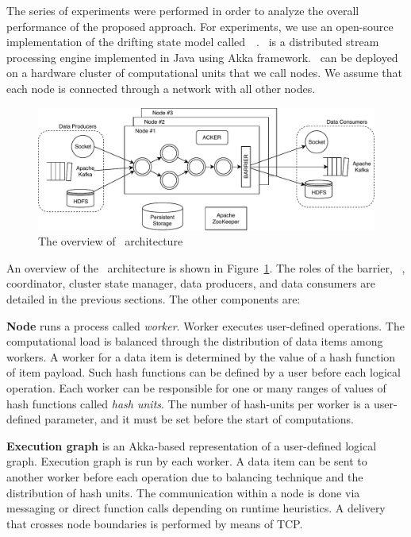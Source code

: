 
\label {fs-experiments-seciton}

The series of experiments were performed in order to analyze the overall performance of the proposed approach. For experiments, we use an open-source implementation of the drifting state model called~\FlameStream\ . \FlameStream\ is a distributed stream processing engine implemented in Java using Akka framework. \FlameStream\ can be deployed on a hardware cluster of computational units that we call nodes. We assume that each node is connected through a network with all other nodes.

\begin{figure}[htbp]
  \centering
  \includegraphics[scale=0.78]{pics/arch}
  \caption{The overview of \FlameStream\ architecture}
  \label {arch}
\end{figure}

An overview of the \FlameStream\ architecture is shown in Figure~\ref{arch}. The roles of the barrier, \Acker\ , coordinator, cluster state manager, data producers, and data consumers are detailed in the previous sections. The other components are:

{\bf Node} runs a process called {\it worker}. Worker executes user-defined operations. The computational load is balanced through the distribution of data items among workers. A worker for a data item is determined by the value of a hash function of item payload. Such hash functions can be defined by a user before each logical operation. Each worker can be responsible for one or many ranges of values of hash functions called {\it hash units}. The number of hash-units per worker is a user-defined parameter, and it must be set before the start of computations. 

{\bf Execution graph} is an Akka-based representation of a user-defined logical graph. Execution graph is run by each worker. A data item can be sent to another worker before each operation due to balancing technique and the distribution of hash units. The communication within a node is done via messaging or direct function calls depending on runtime heuristics. A delivery that crosses node boundaries is performed by means of TCP.

